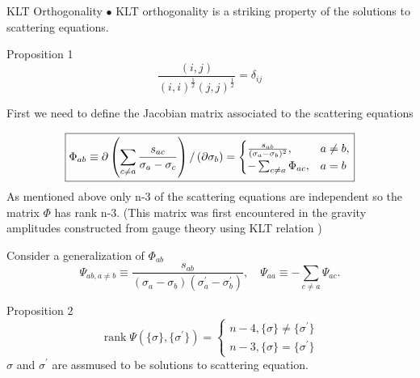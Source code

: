 \documentclass{beamer}
\begin{document}
\begin{frame}{KLT Orthogonality}
    $\bullet$ KLT orthogonality is a striking property of the solutions to scattering equations.
    \begin{block}{Proposition 1}
        \begin{equation*}
            \frac{(i,j)}{(i,i)^{\frac12}(j,j)^{\frac12}}=\delta_{ij}
        \end{equation*}
    \end{block}
    
\end{frame}
\begin{frame}
    First we need to define the Jacobian matrix associated to the scattering equations
        
        \begin{equation*}
            \boxed{
            \label{jacobbi}
            \Phi_{ab}\equiv\partial\left(\sum_{c\neq a}\frac{s_{ac}}{\sigma_a-\sigma_c}\right)/\left(\partial\sigma_b\right)=\begin{cases}\frac{s_{ab}}{(\sigma_a-\sigma_b)^2},&a\neq b,\\-\sum_{c\neq a}\Phi_{ac}, &a=b\end{cases}
            }
        \end{equation*}
    As mentioned above only n-3 of the scattering equations are independent so the matrix $\Phi$ has \alert{rank n-3}.  (This matrix was first encountered in the gravity amplitudes constructed from gauge theory using KLT relation ) 
\end{frame}
\begin{frame}
    Consider a generalization of $\Phi_{ab}$ 
    \begin{equation*}
        \Psi_{ab,a\neq b}\equiv\frac{s_{ab}}{(\sigma_a-\sigma_b)(\sigma_a^{\prime}-\sigma_b^{\prime})},\quad\Psi_{aa}\equiv-\sum_{c\neq a}\Psi_{ac}.
    \end{equation*}
    \begin{block}{Proposition 2}
        \begin{equation*}
            \operatorname{rank}\Psi(\{\sigma\},\{\sigma^{\prime}\})=\begin{cases}n-4, \{\sigma\}\neq\{\sigma^{\prime}\}\\n-3, \{\sigma\}=\{\sigma^{\prime}\}\end{cases}
        \end{equation*}
        $\sigma$ and $\sigma^\prime$ are assmused to be solutions to scattering equation.
    \end{block}
\end{frame}
\end{document}
